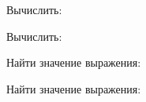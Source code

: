 \begin{listofex}
	\item Вычислить:
	\begin{enumcols}[itemcolumns=2]
		\item {}
		\item {}
		\item {}
		\item {}
	\end{enumcols}
	\item Вычислить:
	\begin{enumcols}[itemcolumns=2]
		\item {}
		\item {}
	\end{enumcols}
	\item Найти значение выражения:
	\begin{enumcols}[itemcolumns=2]
		\item {}
		\item {}
	\end{enumcols}
	\item {}
	\item Найти значение выражения:
	\begin{enumcols}[itemcolumns=2]
		\item {}
		\item {}
	\end{enumcols}
	\item {}
\end{listofex}